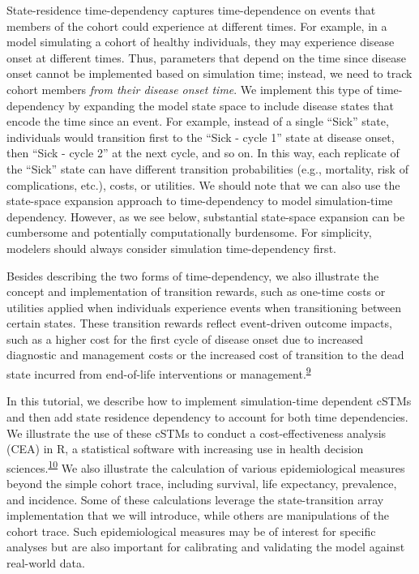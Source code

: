 \documentclass[
]{article}
\begin{document}
State-residence time-dependency captures time-dependence on events that members of the cohort could experience at different times. For example, in a model simulating a cohort of healthy individuals, they may experience disease onset at different times. Thus, parameters that depend on the time since disease onset cannot be implemented based on simulation time; instead, we need to track cohort members \emph{from their disease onset time}. We implement this type of time-dependency by expanding the model state space to include disease states that encode the time since an event. For example, instead of a single ``Sick'' state, individuals would transition first to the ``Sick - cycle 1'' state at disease onset, then ``Sick - cycle 2'' at the next cycle, and so on. In this way, each replicate of the ``Sick'' state can have different transition probabilities (e.g., mortality, risk of complications, etc.), costs, or utilities. We should note that we can also use the state-space expansion approach to time-dependency to model simulation-time dependency. However, as we see below, substantial state-space expansion can be cumbersome and potentially computationally burdensome. For simplicity, modelers should always consider simulation time-dependency first.

Besides describing the two forms of time-dependency, we also illustrate the concept and implementation of transition rewards, such as one-time costs or utilities applied when individuals experience events when transitioning between certain states. These transition rewards reflect event-driven outcome impacts, such as a higher cost for the first cycle of disease onset due to increased diagnostic and management costs or the increased cost of transition to the dead state incurred from end-of-life interventions or management.\textsuperscript{\protect\hyperlink{ref-Krijkamp2019}{9}}

In this tutorial, we describe how to implement simulation-time dependent cSTMs and then add state residence dependency to account for both time dependencies. We illustrate the use of these cSTMs to conduct a cost-effectiveness analysis (CEA) in R, a statistical software with increasing use in health decision sciences.\textsuperscript{\protect\hyperlink{ref-Jalal2017b}{10}} We also illustrate the calculation of various epidemiological measures beyond the simple cohort trace, including survival, life expectancy, prevalence, and incidence. Some of these calculations leverage the state-transition array implementation that we will introduce, while others are manipulations of the cohort trace. Such epidemiological measures may be of interest for specific analyses but are also important for calibrating and validating the model against real-world data.
\end{document}
